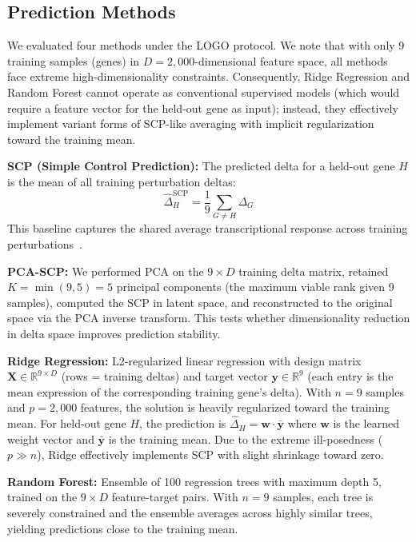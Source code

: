 \documentclass[12pt,number,sort&compress]{elsarticle}
\begin{document}
\subsection{Prediction Methods}
\label{sec:methods_predictors}

We evaluated four methods under the LOGO protocol. We note that with only
9 training samples (genes) in $D = 2{,}000$-dimensional feature space, all
methods face extreme high-dimensionality constraints. Consequently,
Ridge Regression and Random Forest cannot operate as conventional supervised
models (which would require a feature vector for the held-out gene as input);
instead, they effectively implement variant forms of SCP-like averaging
with implicit regularization toward the training mean.

\textbf{SCP (Simple Control Prediction):} The predicted delta for a held-out
gene $H$ is the mean of all training perturbation deltas:
\begin{equation}
\hat{\Delta}_H^{\text{SCP}} = \frac{1}{9}\sum_{G \neq H} \Delta_G
\label{eq:scp}
\end{equation}
This baseline captures the shared average transcriptional response across
training perturbations~\citep{Weinreb2018SCP}.

\textbf{PCA-SCP:} We performed PCA on the $9 \times D$ training delta matrix,
retained $K = \min(9, 5) = 5$ principal components (the maximum viable rank
given 9 samples), computed the SCP in latent space, and reconstructed to
the original space via the PCA inverse transform. This tests whether
dimensionality reduction in delta space improves prediction stability.

\textbf{Ridge Regression:} L2-regularized linear regression with design matrix
$\mathbf{X} \in \mathbb{R}^{9 \times D}$ (rows = training deltas) and target
vector $\mathbf{y} \in \mathbb{R}^{9}$ (each entry is the mean expression of
the corresponding training gene's delta). With $n = 9$ samples and $p = 2{,}000$
features, the solution is heavily regularized toward the training mean.
For held-out gene $H$, the prediction is $\hat{\Delta}_H = \mathbf{w}
\cdot \bar{\mathbf{y}}$ where $\mathbf{w}$ is the learned weight vector and
$\bar{\mathbf{y}}$ is the training mean. Due to the extreme ill-posedness
($p \gg n$), Ridge effectively implements SCP with slight shrinkage toward zero.

\textbf{Random Forest:} Ensemble of 100 regression trees with maximum depth 5,
trained on the $9 \times D$ feature-target pairs. With $n = 9$ samples, each
tree is severely constrained and the ensemble averages across highly similar
trees, yielding predictions close to the training mean.
\end{document}
